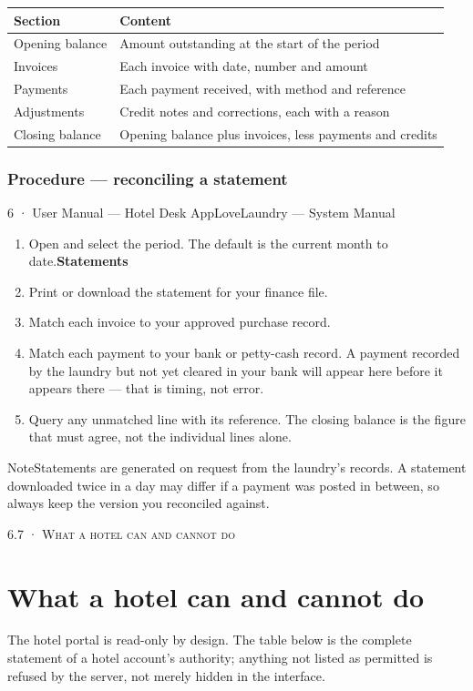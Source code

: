 \documentclass[11pt,a4paper,oneside]{book}
\begin{document}
\begin{center}\small
\begin{tabularx}{\linewidth}{|X|X|}
\hline
\rowcolor{lightgrey}
\textbf{Section} & \textbf{Content} \\ \hline
Opening balance & Amount outstanding at the start of the period \\ \hline
Invoices & Each invoice with date, number and amount \\ \hline
Payments & Each payment received, with method and reference \\ \hline
Adjustments & Credit notes and corrections, each with a reason \\ \hline
Closing balance & Opening balance plus invoices, less payments and credits \\ \hline
\end{tabularx}
\end{center}
\subsubsection*{Procedure — reconciling a statement}
6 · User Manual — Hotel Desk AppLoveLaundry — System Manual

\begin{enumerate}
\item Open  and select the period. The default is the current month to date.\textbf{Statements}
\item Print or download the statement for your finance file.
\item Match each invoice to your approved purchase record.
\item Match each payment to your bank or petty-cash record. A payment recorded by the laundry but not yet cleared in your bank will appear here before it appears there — that is timing, not error.
\item Query any unmatched line with its reference. The closing balance is the figure that must agree, not the individual lines alone.
\end{enumerate}
\begin{notebox}NoteStatements are generated on request from the laundry's records. A statement downloaded twice in a day may differ if a payment was posted in between, so always keep the version you reconciled against.\end{notebox}
\textsc{\small\color{crimson}6.7 · What a hotel can and cannot do}\par\medskip
\section*{What a hotel can and cannot do}
The hotel portal is read-only by design. The table below is the complete statement of a hotel account's authority; anything not listed as permitted is refused by the server, not merely hidden in the interface.
\end{document}
